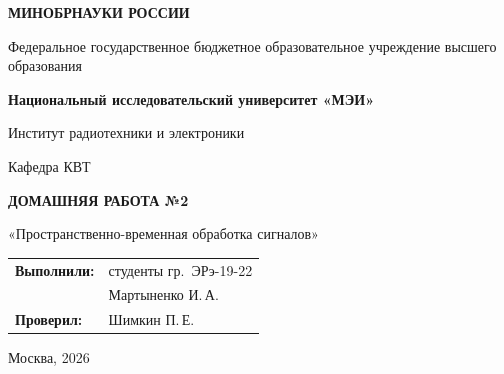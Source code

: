 \begin{titlepage}
    \centering
    {\bfseries МИНОБРНАУКИ РОССИИ\par}
    Федеральное государственное бюджетное образовательное учреждение высшего образования \\
    {\bfseries Национальный исследовательский университет «МЭИ»\par}
    \vspace{1cm}
    Институт радиотехники и электроники\par
    Кафедра КВТ\par
    \vspace{3cm}
    
    {\bfseries\large ДОМАШНЯЯ РАБОТА №2\par}
    \vspace{0.5cm}
    {\large «Пространственно-временная обработка сигналов»\par}
    
    \vspace{3.5cm}
 \vspace{1.5cm}
\noindent\hfill
\begin{tabular}{@{}ll@{}}
    \textbf{Выполнили:} & студенты гр.~ЭРэ-19-22 \\
                        & Мартыненко И.\,А. \\
    \textbf{Проверил:}  & Шимкин П.\,Е.
\end{tabular}   
    \vfill
    {Москва, 2026}
\end{titlepage}
